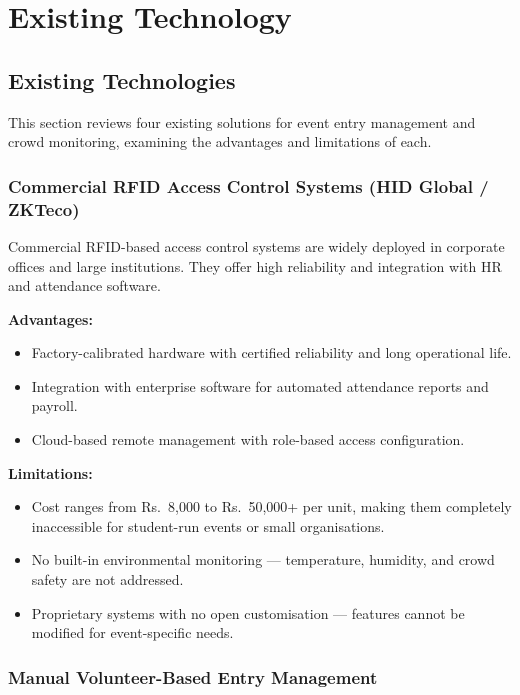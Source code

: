 \documentclass[12pt,a4paper]{report}
\begin{document}
\chapter{Existing Technology}

\section{Existing Technologies}

This section reviews four existing solutions for event entry management and crowd monitoring, examining the advantages and limitations of each.

\subsection{Commercial RFID Access Control Systems (HID Global / ZKTeco)}

Commercial RFID-based access control systems are widely deployed in corporate offices and large institutions. They offer high reliability and integration with HR and attendance software.

\textbf{Advantages:}
\begin{itemize}[leftmargin=*]
    \item Factory-calibrated hardware with certified reliability and long operational life.
    \item Integration with enterprise software for automated attendance reports and payroll.
    \item Cloud-based remote management with role-based access configuration.
\end{itemize}

\textbf{Limitations:}
\begin{itemize}[leftmargin=*]
    \item Cost ranges from Rs.~8,000 to Rs.~50,000+ per unit, making them completely inaccessible for student-run events or small organisations.
    \item No built-in environmental monitoring --- temperature, humidity, and crowd safety are not addressed.
    \item Proprietary systems with no open customisation --- features cannot be modified for event-specific needs.
\end{itemize}

\subsection{Manual Volunteer-Based Entry Management}
\end{document}
